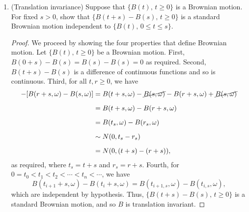 \documentclass[11pt,oneside,english]{amsart}
\theoremstyle{definition}
\newcommand{\1}{\mathbbm{1}}
\begin{document}
\begin{enumerate}[leftmargin=*]
\begin{proof}
Write $A_n=\sum_{i=1}^nX_i/n$, and suppose $f$ is differentiable with nonzero derivative at $\mu$. By the Central Limit Theorem, we know that
\[
\frac{A_n-\mu}{\sigma/\sqrt{n}}\xrightarrow{d}N(0,1).
\]
We can approximate $f(A_n)$ near $\mu$ linearly since it is differentiable there, and get the following:
\begin{align*}
f(A_n)&= |f'(\mu)|(A_n-\mu)+f(\mu)+O(x)\\[2mm]
f(A_n)-f(\mu)&= |f'(\mu)|(A_n-\mu)+O(x)\\[2mm]
\sqrt{n}(f(A_n)-f(\mu))&= |f'(\mu)|\sigma\sqrt{n}+\sqrt{n}O(x).
\end{align*}

Now, $O(x)\to0$ as $A_n\to\mu$, so the right hand side goes to $N(0,|f'(\mu)|\sigma^2)$ in distribution, so we can conclude that 
\[
\frac{\sqrt{n}\left(f(A_n)-f(\mu)\right)}{\sigma|f'(\mu)|}\xrightarrow{d}N(0,1).\qedhere
\]
\end{proof}



\vfill
\pagebreak




\item (Translation invariance) Suppose that $\{B(t),\,t\geq0\}$ is a Brownian motion. For fixed $s>0$, show that $\{B(t+s)-B(s),\,t\geq0\}$ is a standard Brownian motion independent to $\{B(t),\,0\leq t\leq s\}$.

\begin{proof}
We proceed by showing the four properties that define Brownian motion. Let $\{B(t),\,t\geq0\}$ be a Brownian motion. First, $B(0+s)-B(s)=B(s)-B(s)=0$ as required. Second, $B(t+s)-B(s)$ is a difference of continuous functions and so is continuous. Third, for all $t,r\geq0$, we have
\begin{align*}
[B(t+s,\omega)-B(s,\omega)]-[B(r+s,\omega)-B(s,\omega)]&=B(t+s,\omega)-\cancel{B(s,\omega)}-B(r+s,\omega)+\cancel{B(s,\omega)}\\[2mm]
&=B(t+s,\omega)-B(r+s,\omega)\\[2mm]
&=B(t_s,\omega)-B(r_s,\omega)\\[2mm]
&\sim N(0,t_s-r_s)\\[2mm]
&=N(0,(t+s)-(r+s)),
\end{align*}
as required, where $t_s=t+s$ and $r_s=r+s$. Fourth, for $0=t_0<t_1<t_2<\cdots<t_n<\cdots$, we have
\[
B(t_{i+1}+s,\omega)-B(t_i+s,\omega)=B(t_{i+1,s},\omega)-B(t_{i,s},\omega),
\]
which are independent by hypothesis. Thus, $\{B(t+s)-B(s),\,t\geq0\}$ is a standard Brownian motion, and so $B$ is translation invariant.
\end{proof}







\end{enumerate}
\end{document}
